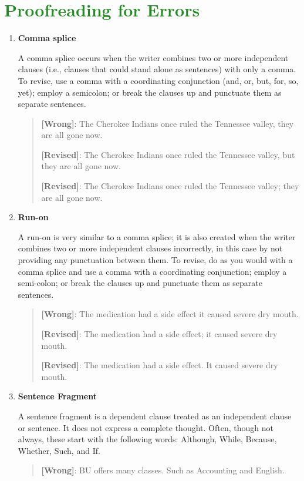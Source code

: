
 
\section{\textcolor{ForestGreen}{Proofreading for Errors}}

\begin{enumerate}

\item \textbf{Comma splice}

A comma splice occurs when the writer combines two or more independent clauses (i.e., clauses that could stand alone as sentences) with only a comma. To revise, use a comma with a coordinating conjunction (and, or, but, for, so, yet); employ a semicolon; or break the clauses up and punctuate them as separate sentences.
\begin{quote}
\textbf{[Wrong]}: The Cherokee Indians once ruled the Tennessee valley, they are all gone now.

\textbf{[Revised]}:  The Cherokee Indians once ruled the Tennessee valley, but they are all gone now.

\textbf{[Revised]}: The Cherokee Indians once ruled the Tennessee valley; they are all gone now.
\end{quote}
\item \textbf{Run-on}

A run-on is very similar to a comma splice; it is also created when the writer combines two or more independent clauses incorrectly, in this case by not providing any punctuation between them.  To revise, do as you would with a comma splice and use a comma with a coordinating conjunction; employ a semi-colon; or break the clauses up and punctuate them as separate sentences.
\begin{quote}
\textbf{[Wrong]}: The medication had a side effect it caused severe dry mouth.

\textbf{[Revised]}: The medication had a side effect; it caused severe dry mouth.

\textbf{[Revised]}: The medication had a side effect. It caused severe dry mouth.
\end{quote}
\item \textbf{Sentence Fragment}

A sentence fragment is a dependent clause treated as an independent clause or sentence. It does not express a complete thought. Often, though not always, these start with the following words: Although, While, Because, Whether, Such, and If.
\begin{quote}
\textbf{[Wrong]}: BU offers many classes. Such as Accounting and English.


\end{quote}
\end{enumerate}

